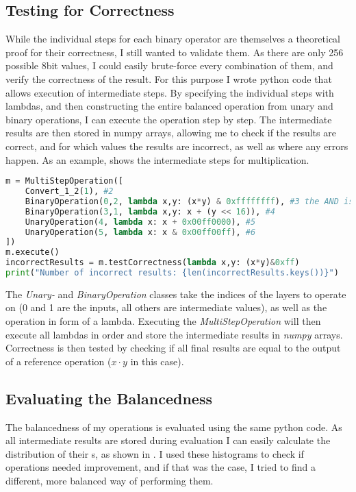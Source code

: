 \subsection{Testing for Correctness}
\label{correctness}
While the individual steps for each binary operator are themselves a theoretical proof for their correctness, I still wanted to validate them.
As there are only 256 possible 8bit values, I could easily brute-force every combination of them, and verify the correctness of the result.
For this purpose I wrote python code that allows execution of intermediate steps.
By specifying the individual steps with lambdas, and then constructing the entire balanced operation from unary and binary operations, I can execute the operation step by step.
The intermediate results are then stored in numpy arrays, allowing me to check if the results are correct, and for which values the results are incorrect, as well as where any errors happen.
As an example,  shows the intermediate steps for multiplication.

\begin{lstlisting}[language=python, caption=Step-by-step execution of balanced multiplication, label=lst:multiop]
m = MultiStepOperation([
    Convert_1_2(1), #2
    BinaryOperation(0,2, lambda x,y: (x*y) & 0xffffffff), #3 the AND is required due to python's arbitrary precision integers
    BinaryOperation(3,1, lambda x,y: x + (y << 16)), #4
    UnaryOperation(4, lambda x: x + 0x00ff0000), #5
    UnaryOperation(5, lambda x: x & 0x00ff00ff), #6
])
m.execute()
incorrectResults = m.testCorrectness(lambda x,y: (x*y)&0xff)
print("Number of incorrect results: {len(incorrectResults.keys())}")
\end{lstlisting}

The \emph{Unary-} and \emph{BinaryOperation} classes take the indices of the layers to operate on (0 and 1 are the inputs, all others are intermediate values), as well as the operation in form of a lambda.
Executing the \emph{MultiStepOperation} will then execute all lambdas in order and store the intermediate results in \emph{numpy} arrays.
Correctness is then tested by checking if all final results are equal to the output of a reference operation ($x \cdot y$ in this case).

\subsection{Evaluating the Balancedness}
\label{balance-eval}
The balancedness of my operations is evaluated using the same python code.
As all intermediate results are stored during evaluation I can easily calculate the distribution of their \hammingw s, as shown in .
I used these histograms to check if operations needed improvement, and if that was the case, I tried to find a different, more balanced way of performing them.

